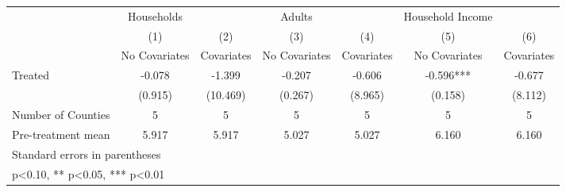 {
\def\sym#1{\ifmmode^{#1}\else\(^{#1}\)\fi}
\begin{tabular}{l*{6}{c}}
\hline\hline
            &  Households   &               &      Adults   &               &Household Income   &               \\
            &\multicolumn{1}{c}{(1)}&\multicolumn{1}{c}{(2)}&\multicolumn{1}{c}{(3)}&\multicolumn{1}{c}{(4)}&\multicolumn{1}{c}{(5)}&\multicolumn{1}{c}{(6)}\\
            &\multicolumn{1}{c}{No Covariates}&\multicolumn{1}{c}{Covariates}&\multicolumn{1}{c}{No Covariates}&\multicolumn{1}{c}{Covariates}&\multicolumn{1}{c}{No Covariates}&\multicolumn{1}{c}{Covariates}\\
\hline
Treated     &      -0.078   &      -1.399   &      -0.207   &      -0.606   &      -0.596***&      -0.677   \\
            &     (0.915)   &    (10.469)   &     (0.267)   &     (8.965)   &     (0.158)   &     (8.112)   \\
\hline
Number of Counties&           5   &           5   &           5   &           5   &           5   &           5   \\
Pre-treatment mean&       5.917   &       5.917   &       5.027   &       5.027   &       6.160   &       6.160   \\
\hline\hline
\multicolumn{7}{l}{\footnotesize Standard errors in parentheses}\\
\multicolumn{7}{l}{\footnotesize * p<0.10, ** p<0.05, *** p<0.01}\\
\end{tabular}
}
